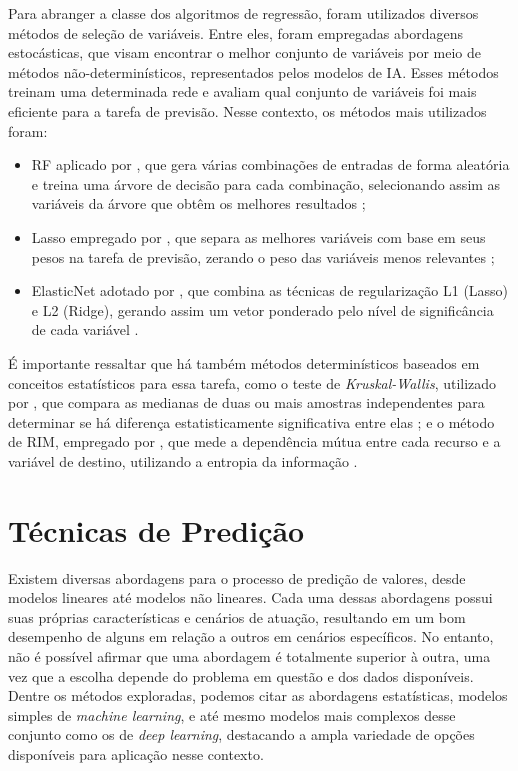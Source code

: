 Para abranger a classe dos algoritmos de regressão, foram utilizados diversos métodos de seleção de variáveis. Entre eles, foram empregadas abordagens estocásticas, que visam encontrar o melhor conjunto de variáveis por meio de métodos não-determinísticos, representados pelos modelos de IA. Esses métodos treinam uma determinada rede e avaliam qual conjunto de variáveis foi mais eficiente para a tarefa de previsão. Nesse contexto, os métodos mais utilizados foram: 
\begin{itemize}
    \item \ac{RF} aplicado por , que gera várias combinações de entradas de forma aleatória e treina uma árvore de decisão para cada combinação, selecionando assim as variáveis da árvore que obtêm os melhores resultados \cite{breiman2001random}; 
    \item Lasso empregado por , que separa as melhores variáveis com base em seus pesos na tarefa de previsão, zerando o peso das variáveis menos relevantes \cite{muthukrishnan2016lasso}; 
    \item ElasticNet adotado por \cite{zhang2023forecasting}, que combina as técnicas de regularização L1 (Lasso) e L2 (Ridge), gerando assim um vetor ponderado pelo nível de significância de cada variável \cite{amini2021two}.
\end{itemize}
É importante ressaltar que há também métodos determinísticos baseados em conceitos estatísticos para essa tarefa, como o teste de \textit{Kruskal-Wallis}, utilizado por , que compara as medianas de duas ou mais amostras independentes para determinar se há diferença estatisticamente significativa entre elas \cite{kruskal1952use}; e o método de \ac{RIM}, empregado por , que mede a dependência mútua entre cada recurso e a variável de destino, utilizando a entropia da informação \cite{kraskov2004estimating}.

\section{Técnicas de Predição}
\label{subsec:tecnicas_predicao}
Existem diversas abordagens para o processo de predição de valores, desde modelos lineares até modelos não lineares. Cada uma dessas abordagens possui suas próprias características e cenários de atuação, resultando em um bom desempenho de alguns em relação a outros em cenários específicos. No entanto, não é possível afirmar que uma abordagem é totalmente superior à outra, uma vez que a escolha depende do problema em questão e dos dados disponíveis. Dentre os métodos exploradas, podemos citar as abordagens estatísticas, modelos simples de \textit{machine learning}, e até mesmo modelos mais complexos desse conjunto como os de \textit{deep learning}, destacando a ampla variedade de opções disponíveis para aplicação nesse contexto.

